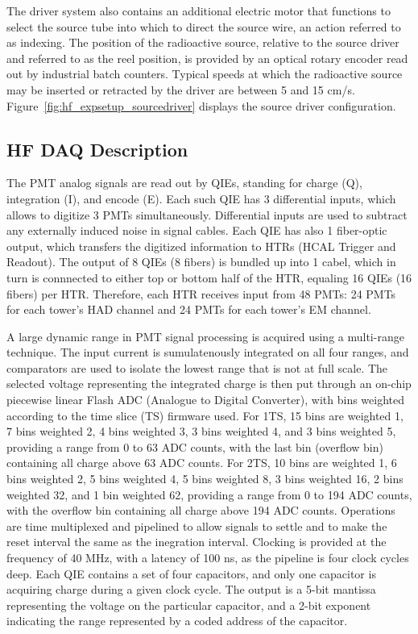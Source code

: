 The driver system also contains an additional electric motor that functions to
select the source tube into which to direct the source wire, an action referred
to as indexing. The position of the radioactive source, relative to the source
driver and referred to as the reel position, is provided by an optical rotary
encoder read out by industrial batch counters. Typical speeds at which the
radioactive source may be inserted or retracted by the driver are between 5 and
15 cm/s. Figure~\ref{fig:hf_expsetup_sourcedriver} displays the source driver configuration.

\subsection{HF DAQ Description}
The PMT analog signals are read out by QIEs, standing for charge (Q),
integration (I), and encode (E). Each such QIE has 3 differential inputs, which
allows to digitize 3 PMTs simultaneously. Differential inputs are used to subtract
any externally induced noise in signal cables. Each QIE has also 1 fiber-optic
output, which transfers the digitized information to HTRs (HCAL Trigger and
Readout). The output of 8 QIEs (8 fibers) is bundled up into 1 cabel, which in
turn is connnected to either top or bottom half of the HTR, equaling 16 QIEs
(16 fibers) per HTR. Therefore, each HTR receives input from 48 PMTs: 24 PMTs for
each tower's HAD channel and 24 PMTs for each tower's EM channel.

A large dynamic range in PMT signal processing is acquired using
a multi-range technique. The input current is sumulatenously integrated on all
four ranges, and comparators are used to isolate the lowest range that is not at
full scale. The selected voltage representing the integrated charge is then put
through an on-chip piecewise linear Flash ADC (Analogue to Digital Converter),
with bins weighted according to the time slice (TS) firmware used. For 1TS, 15
bins are weighted 1, 7 bins weighted 2, 4 bins weighted 3, 3 bins weighted 4,
and 3 bins weighted 5, providing a range from 0 to 63 ADC counts, with the last
bin (overflow bin) containing all charge above 63 ADC counts. For 2TS, 10 bins
are weighted 1, 6 bins weighted 2, 5 bins weighted 4, 5 bins weighted 8, 3 bins
weighted 16, 2 bins weighted 32, and 1 bin weighted 62, providing a range from
0 to 194 ADC counts, with the overflow bin containing all charge above 194 ADC
counts. Operations are time multiplexed and pipelined to allow signals to
settle and to make the reset interval the same as the inegration interval.
Clocking is provided at the frequency of 40 MHz, with a latency of
100 ns, as the pipeline is four clock cycles deep. Each QIE contains a
set of four capacitors, and only one capacitor is acquiring charge during a
given clock cycle. The output is a 5-bit mantissa representing the voltage on
the particular capacitor, and a 2-bit exponent indicating the range
represented by a coded address of the capacitor.

